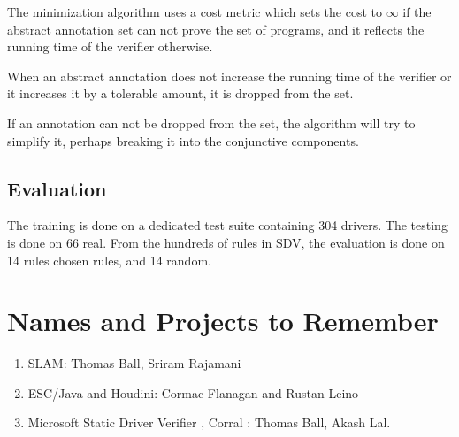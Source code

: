 \documentclass[12pt]{article}
\begin{document}
The minimization algorithm uses a cost metric which sets the cost to $\infty$ if the abstract annotation set can not prove the set of programs, and it reflects the running time of the verifier otherwise.

When an abstract annotation does not increase the running time of the verifier or it increases it by a tolerable amount, it is dropped from the set.

If an annotation can not be dropped from the set, the algorithm will try to simplify it, perhaps breaking it into the conjunctive components.

\subsection{Evaluation}
The training is done on a dedicated test suite containing 304 drivers. The testing is done on 66 real. From the hundreds of rules in SDV, the evaluation is done on 14 rules chosen rules, and 14 random.

\section{Names and Projects to Remember}

\begin{enumerate}
\item SLAM\cite{slam}: Thomas Ball, Sriram Rajamani
\item ESC/Java \cite{esc} and Houdini\cite{houdini}: Cormac Flanagan and Rustan Leino 
\item Microsoft Static Driver Verifier \cite{SDV}, Corral \cite{Corral}: Thomas Ball, Akash Lal.
\end{enumerate}




\end{document}
